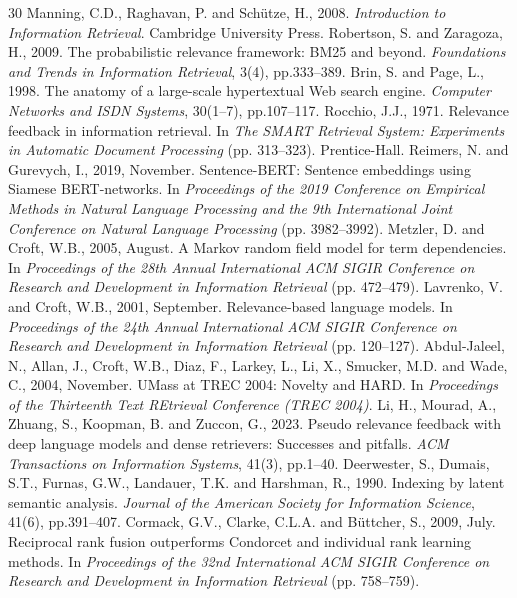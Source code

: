 \documentclass[conference]{IEEEtran}
\begin{document}
\begin{thebibliography}{30}
 Manning, C.D., Raghavan, P. and Sch\"utze, H., 2008. \textit{Introduction to Information Retrieval}. Cambridge University Press.
 Robertson, S. and Zaragoza, H., 2009. The probabilistic relevance framework: BM25 and beyond. \textit{Foundations and Trends in Information Retrieval}, 3(4), pp.333--389.
 Brin, S. and Page, L., 1998. The anatomy of a large-scale hypertextual Web search engine. \textit{Computer Networks and ISDN Systems}, 30(1--7), pp.107--117.
 Rocchio, J.J., 1971. Relevance feedback in information retrieval. In \textit{The SMART Retrieval System: Experiments in Automatic Document Processing} (pp. 313--323). Prentice-Hall.
 Reimers, N. and Gurevych, I., 2019, November. Sentence-BERT: Sentence embeddings using Siamese BERT-networks. In \textit{Proceedings of the 2019 Conference on Empirical Methods in Natural Language Processing and the 9th International Joint Conference on Natural Language Processing} (pp. 3982--3992).
 Metzler, D. and Croft, W.B., 2005, August. A Markov random field model for term dependencies. In \textit{Proceedings of the 28th Annual International ACM SIGIR Conference on Research and Development in Information Retrieval} (pp. 472--479).
 Lavrenko, V. and Croft, W.B., 2001, September. Relevance-based language models. In \textit{Proceedings of the 24th Annual International ACM SIGIR Conference on Research and Development in Information Retrieval} (pp. 120--127).
 Abdul-Jaleel, N., Allan, J., Croft, W.B., Diaz, F., Larkey, L., Li, X., Smucker, M.D. and Wade, C., 2004, November. UMass at TREC 2004: Novelty and HARD. In \textit{Proceedings of the Thirteenth Text REtrieval Conference (TREC 2004)}.
 Li, H., Mourad, A., Zhuang, S., Koopman, B. and Zuccon, G., 2023. Pseudo relevance feedback with deep language models and dense retrievers: Successes and pitfalls. \textit{ACM Transactions on Information Systems}, 41(3), pp.1--40.
 Deerwester, S., Dumais, S.T., Furnas, G.W., Landauer, T.K. and Harshman, R., 1990. Indexing by latent semantic analysis. \textit{Journal of the American Society for Information Science}, 41(6), pp.391--407.
 Cormack, G.V., Clarke, C.L.A. and B\"uttcher, S., 2009, July. Reciprocal rank fusion outperforms Condorcet and individual rank learning methods. In \textit{Proceedings of the 32nd International ACM SIGIR Conference on Research and Development in Information Retrieval} (pp. 758--759).

\end{thebibliography}
\end{document}
